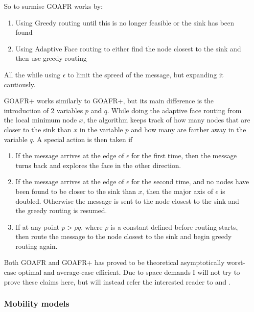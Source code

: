 So to surmise GOAFR works by:
\begin{enumerate}
\item Using Greedy routing until this is no longer feasible or the sink has been found
\item Using Adaptive Face routing to either find the node closest to the sink and then use greedy routing
\end{enumerate}
All the while using $\epsilon$ to limit the spreed of the message, but expanding it cautiously.

GOAFR+ works similarly to GOAFR+, but its main difference is the introduction of 2 variables $p$ and $q$. While doing the adaptive face routing from the local minimum node $x$, the algorithm keeps track of how many nodes that are closer to the sink than $x$ in the variable $p$ and how many are farther away in the variable $q$.
A special action is then taken if
\begin{enumerate}
\item If the message arrives at the edge of $\epsilon$ for the first time, then the message turns back and explores the face in the other direction. 
\item If the message arrives at the edge of $\epsilon$ for the second time, and no nodes have been found to be closer to the sink than $x$, then the major axis of $\epsilon$ is doubled. Otherwise the message is sent to the node closest to the sink and the greedy routing is resumed.
\item If at any point $p > \rho q$, where $\rho$ is a constant defined before routing starts, then route the message to the node closest to the sink and begin greedy routing again.
\end{enumerate}

Both GOAFR and GOAFR+ has proved to be theoretical asymptotically worst-case optimal and average-case efficient. Due to space demands I will not try to prove these claims here, but will instead refer the interested reader to \cite{gopher} and \cite{gopher+}.  

\subsubsection{Mobility models}
